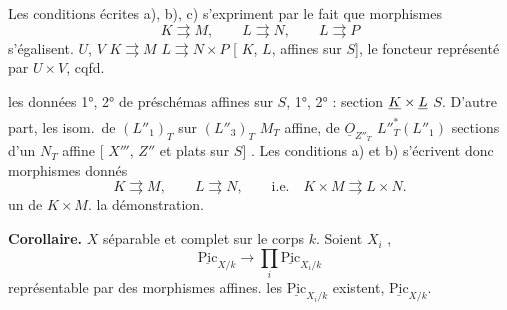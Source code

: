 \documentclass[11pt,a4paper]{article}
\begin{document}

Les conditions écrites a), b), c) s'expriment par le fait que 
  morphismes
\[
  K \rightrightarrows M, \qquad L \rightrightarrows N, \qquad
  L \rightrightarrows P
\]
s'égalisent.    $U$, $V$
\ill{}    \ill{}
$K \rightrightarrows M$  $L \rightrightarrows N \times P$
 [  
$K$, $L$,  affines sur $S$], le foncteur
  représenté par $U \times V$, cqfd.

 les données 1°, 2° 
  
 de préschémas affines
 sur $S$,  1°, 2° : 
section  $\struck{K} \times \struck{L}$  $S$.
\struck{\ill{}} D'autre part, les isom.\ de $(L''_1)_T$ sur $(L''_3)_T$
  
\ill{} $M_T$ affine,  \ill{}  de
$\underline{O}_{Z''_T}$  $L''^{*}_{T}(L''_1)$ 
sections d'un $N_T$ affine [ $X'''$, $Z''$ \struck{\ill{}}
 et plats sur $S$] \struck{\ill{}}. Les conditions a) et b)
s'écrivent donc    \ill{}
  morphismes donnés
\[
  K \rightrightarrows M, \qquad L \rightrightarrows N, \qquad
  \text{i.e.} \quad K \times M \rightrightarrows L \times N .
\]
 \ill{}   un
  de $K \times M$. 
 la démonstration.

\textbf{Corollaire.} $X$ séparable et complet sur le corps $k$.
 Soient $X_i$
  
 ,
  \struck{\ill{}}
\[
  \underline{\mathrm{Pic}}_{X/k} \longrightarrow
  \prod_i \underline{\mathrm{Pic}}_{X_i/k}
\]
 
 représentable par des morphismes affines. 
 les $\underline{\mathrm{Pic}}_{X_i/k}$ existent,  $\underline{\mathrm{Pic}}_{X/k}$.
\end{document}
